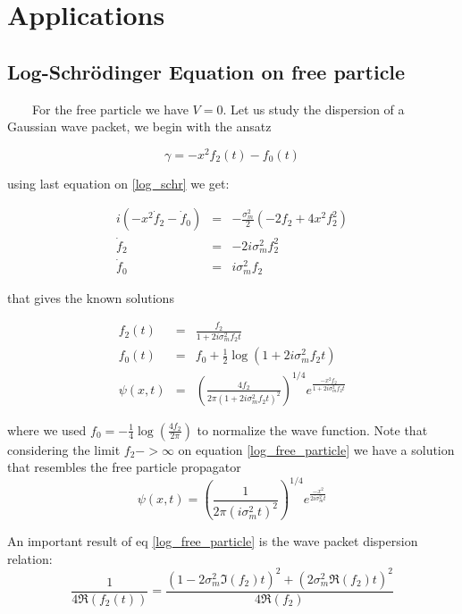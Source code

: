 \documentclass[a4paper,12pt]{article}
\begin{document}

\section{Applications}

\subsection{Log-Schr\"odinger Equation on free particle}

~~~~For the free particle we have $V=0$. Let us study the dispersion of a Gaussian wave packet, we begin with the ansatz

\begin{equation}
\gamma = -x^2 f_2(t) - f_0(t)
\end{equation}

using last equation on \ref{log_schr} we get:

\begin{eqnarray}
i \left( -x^2 \dot f_2 - \dot f_0 \right) &=& - \frac{\sigma_m^2}{2} \left( -2 f_2 + 4 x^2 f_2^2 \right)  \nonumber \\
\dot f_2 & = & - 2 i \sigma_m^2 f_2^2 \\
\dot f_0 & = &   i \sigma_m^2 f_2
\end{eqnarray}

that gives the known solutions

\begin{eqnarray}\label{log_free_particle}
f_2(t) & = & \frac{f_2}{1 + 2i \sigma_m^2 f_2 t}  \\
f_0(t) & = & f_0 + \frac{1}{2} \log \left( 1 + 2i \sigma_m^2 f_2 t \right) \\
\psi(x,t) & = & \left( \frac{4 f_2}{2\pi \left( 1 + 2i \sigma_m^2 f_2 t  \right)^{2} } \right)^{1/4} e^{ \frac{-x^2 f_2}{ 
1 + 2i \sigma_m^2 f_2 t} } 
\end{eqnarray}

where we used $ f_0  = - \frac{1}{4} \log \left( \frac{4 f_2}{2 \pi} \right)$ to normalize the wave function. Note that considering the limit 
$f_2->\infty$  on equation \ref{log_free_particle} we have a solution that resembles the free particle propagator
\begin{equation}
\psi(x,t) =   \left( \frac{1}{2\pi \left( i \sigma_m^2 t  \right)^{2} } \right)^{1/4} e^{ \frac{-x^2}{2i \sigma_m^2 t} } 
\end{equation}

An important result of eq \ref{log_free_particle} is the wave packet dispersion relation:
\begin{equation}\label{dispersion_free_particle}
\frac{1}{4\Re(f_2(t))}  = \frac{ (1-2\sigma_m^2\Im(f_2)t)^2 + (2\sigma_m^2\Re(f_2)t)^2}{  4 \Re(f_2)  }
\end{equation}
\end{document}
